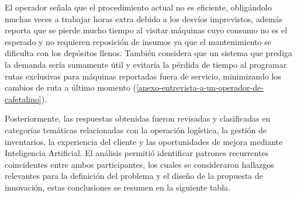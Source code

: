 El operador señala que el procedimiento actual no es eficiente, obligándolo muchas veces a trabajar horas extra debido a los desvíos imprevistos, además reporta que se pierde mucho tiempo al visitar máquinas cuyo consumo no es el esperado y no requieren reposición de insumos ya que el mantenimiento se dificulta con los depósitos llenos. También considera que un sistema que prediga la demanda sería sumamente útil y evitaría la pérdida de tiempo al programar rutas exclusivas para máquinas reportadas fuera de servicio, minimizando los cambios de ruta a último momento (\ref{anexo-entrevista-a-un-operador-de-cafetalino}).

Posteriormente, las respuestas obtenidas fueron revisadas y clasificadas en categorías temáticas relacionadas con la operación logística, la gestión de inventarios, la experiencia del cliente y las oportunidades de mejora mediante Inteligencia Artificial. El análisis permitió identificar patrones recurrentes coincidentes entre ambos participantes, los cuales se consideraron hallazgos relevantes para la definición del problema y el diseño de la propuesta de innovación, estas conclusiones se resumen en la siguiente tabla.

\label{tab:conclusiones-de-las-entrevistas}

